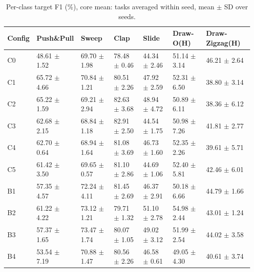 \begin{table}[t]
\centering
\small
\caption{Per-class target F1 (\%), core mean: tasks averaged within seed, mean $\pm$ SD over seeds.}
\label{tab:T9_per_class_f1}
\begin{tabular}{lllllll}
\hline
Config & Push\&Pull & Sweep & Clap & Slide & Draw-O(H) & Draw-Zigzag(H) \\
\hline
C0 & 48.61 $\pm$ 1.52 & 69.70 $\pm$ 1.98 & 78.48 $\pm$ 0.46 & 44.34 $\pm$ 2.46 & 51.14 $\pm$ 3.14 & 46.21 $\pm$ 2.64 \\
C1 & 65.72 $\pm$ 4.66 & 70.84 $\pm$ 1.21 & 80.51 $\pm$ 2.26 & 47.92 $\pm$ 2.59 & 52.31 $\pm$ 6.50 & 38.80 $\pm$ 3.14 \\
C2 & 65.22 $\pm$ 1.59 & 69.21 $\pm$ 2.94 & 82.63 $\pm$ 3.68 & 48.94 $\pm$ 4.72 & 50.89 $\pm$ 6.11 & 38.36 $\pm$ 6.12 \\
C3 & 62.68 $\pm$ 2.15 & 68.84 $\pm$ 1.18 & 82.91 $\pm$ 2.50 & 44.54 $\pm$ 1.75 & 50.98 $\pm$ 7.26 & 41.81 $\pm$ 2.77 \\
C4 & 62.70 $\pm$ 0.64 & 68.94 $\pm$ 1.64 & 81.08 $\pm$ 3.69 & 46.73 $\pm$ 1.60 & 52.35 $\pm$ 2.26 & 39.61 $\pm$ 5.71 \\
C5 & 61.42 $\pm$ 3.50 & 69.65 $\pm$ 0.57 & 81.10 $\pm$ 2.86 & 44.69 $\pm$ 1.06 & 52.40 $\pm$ 5.81 & 42.46 $\pm$ 6.01 \\
B1 & 57.35 $\pm$ 4.57 & 72.24 $\pm$ 4.11 & 81.45 $\pm$ 2.69 & 46.37 $\pm$ 2.91 & 50.18 $\pm$ 6.66 & 44.79 $\pm$ 1.66 \\
B2 & 61.22 $\pm$ 4.22 & 73.12 $\pm$ 1.21 & 79.71 $\pm$ 1.32 & 51.10 $\pm$ 2.78 & 54.98 $\pm$ 2.44 & 43.01 $\pm$ 1.24 \\
B3 & 57.37 $\pm$ 1.65 & 73.47 $\pm$ 1.74 & 80.07 $\pm$ 1.05 & 49.02 $\pm$ 3.12 & 51.99 $\pm$ 2.54 & 44.02 $\pm$ 3.58 \\
B4 & 53.54 $\pm$ 7.19 & 70.88 $\pm$ 1.47 & 80.56 $\pm$ 2.26 & 46.58 $\pm$ 0.61 & 49.05 $\pm$ 4.30 & 40.61 $\pm$ 3.74 \\
\hline
\end{tabular}
\end{table}
